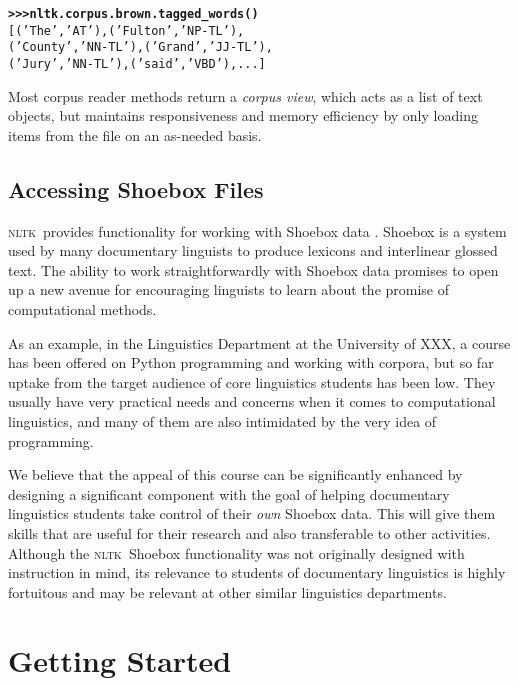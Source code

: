 \documentclass[11pt]{article}
\newcommand{\NLTK}{\textsc{nltk}}
\begin{document}
{\footnotesize
\begin{alltt}
\textbf{>>> nltk.corpus.brown.tagged_words()}
[('The', 'AT'), ('Fulton', 'NP-TL'),
 ('County', 'NN-TL'), ('Grand', 'JJ-TL'),
 ('Jury', 'NN-TL'), ('said', 'VBD'), ...]
\end{alltt}}

Most corpus reader methods return a \emph{corpus view}, which acts as
a list of text objects, but maintains responsiveness and memory
efficiency by only loading items from the file on an as-needed basis.

\subsection{Accessing Shoebox Files}

\NLTK\ provides functionality for working with Shoebox data
\cite{robinson:etal:2007}. Shoebox is a system used by many
documentary linguists to produce lexicons and interlinear glossed text.  The
ability to work straightforwardly with Shoebox data promises to open
up a new avenue for encouraging linguists to learn about the promise
of computational methods. 

As an example, in the Linguistics Department at the University of
XXX, a course has been offered on Python programming and
working with corpora, but so far uptake from the
target audience of core linguistics students has been low. They usually have very
practical needs and concerns when it comes to computational
linguistics, and many of them are also intimidated by the very idea of
programming. %

We believe that the appeal of this course can be significantly
enhanced by designing a significant component
with the goal of helping documentary linguistics students take control of their
\emph{own} Shoebox data. This will give them  skills that are
useful for their research and also transferable to other activities.
Although the \NLTK\ Shoebox functionality was not
originally designed with instruction in mind, its relevance to
students of documentary linguistics is highly fortuitous and
may be relevant at other similar linguistics departments.

\section{Getting Started}
\label{sec:getting-started}
\end{document}
